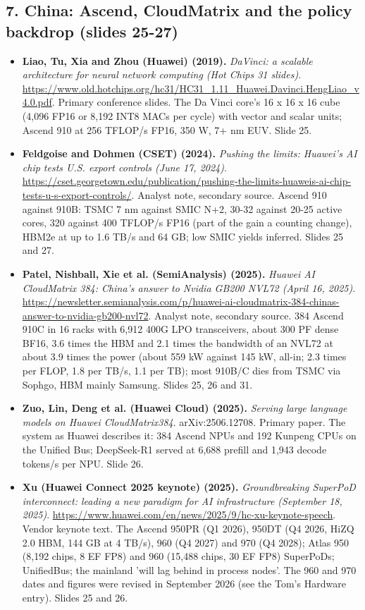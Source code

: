\subsection*{7. China: Ascend, CloudMatrix and the policy backdrop (slides 25-27)}
\begin{itemize}[leftmargin=1.2em,itemsep=3pt]\sloppy
\item \textbf{Liao, Tu, Xia and Zhou (Huawei) (2019).} \textit{DaVinci: a scalable architecture for neural network computing (Hot Chips 31 slides)}. \url{https://www.old.hotchips.org/hc31/HC31_1.11_Huawei.Davinci.HengLiao_v4.0.pdf}. Primary conference slides. The Da Vinci core's 16 x 16 x 16 cube (4,096 FP16 or 8,192 INT8 MACs per cycle) with vector and scalar units; Ascend 910 at 256 TFLOP/s FP16, 350 W, 7+ nm EUV. Slide 25.
\item \textbf{Feldgoise and Dohmen (CSET) (2024).} \textit{Pushing the limits: Huawei's AI chip tests U.S. export controls (June 17, 2024)}. \url{https://cset.georgetown.edu/publication/pushing-the-limits-huaweis-ai-chip-tests-u-s-export-controls/}. Analyst note, secondary source. Ascend 910 against 910B: TSMC 7 nm against SMIC N+2, 30-32 against 20-25 active cores, 320 against 400 TFLOP/s FP16 (part of the gain a counting change), HBM2e at up to 1.6 TB/s and 64 GB; low SMIC yields inferred. Slides 25 and 27.
\item \textbf{Patel, Nishball, Xie et al. (SemiAnalysis) (2025).} \textit{Huawei AI CloudMatrix 384: China's answer to Nvidia GB200 NVL72 (April 16, 2025)}. \url{https://newsletter.semianalysis.com/p/huawei-ai-cloudmatrix-384-chinas-answer-to-nvidia-gb200-nvl72}. Analyst note, secondary source. 384 Ascend 910C in 16 racks with 6,912 400G LPO transceivers, about 300 PF dense BF16, 3.6 times the HBM and 2.1 times the bandwidth of an NVL72 at about 3.9 times the power (about 559 kW against 145 kW, all-in; 2.3 times per FLOP, 1.8 per TB/s, 1.1 per TB); most 910B/C dies from TSMC via Sophgo, HBM mainly Samsung. Slides 25, 26 and 31.
\item \textbf{Zuo, Lin, Deng et al. (Huawei Cloud) (2025).} \textit{Serving large language models on Huawei CloudMatrix384}. arXiv:2506.12708. Primary paper. The system as Huawei describes it: 384 Ascend NPUs and 192 Kunpeng CPUs on the Unified Bus; DeepSeek-R1 served at 6,688 prefill and 1,943 decode tokens/s per NPU. Slide 26.
\item \textbf{Xu (Huawei Connect 2025 keynote) (2025).} \textit{Groundbreaking SuperPoD interconnect: leading a new paradigm for AI infrastructure (September 18, 2025)}. \url{https://www.huawei.com/en/news/2025/9/hc-xu-keynote-speech}. Vendor keynote text. The Ascend 950PR (Q1 2026), 950DT (Q4 2026, HiZQ 2.0 HBM, 144 GB at 4 TB/s), 960 (Q4 2027) and 970 (Q4 2028); Atlas 950 (8,192 chips, 8 EF FP8) and 960 (15,488 chips, 30 EF FP8) SuperPoDs; UnifiedBus; the mainland 'will lag behind in process nodes'. The 960 and 970 dates and figures were revised in September 2026 (see the Tom's Hardware entry). Slides 25 and 26.

\end{itemize}
